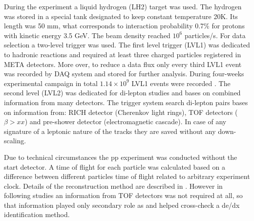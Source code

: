 During the experiment a liquid hydrogen (LH2) target was used. The hydrogen was stored in a special tank designated to keep constant temperature 20K. Its length was 50 mm, what corresponds to interaction probability 0.7\% for protons with kinetic energy 3.5 GeV. The beam density reached $10^6$ particles/s. For data selection a two-level trigger was used. The first level trigger (LVL1) was dedicated to hadronic reactions and required at least three charged particles registered in META detectors. More over, to reduce a data flux only every third LVL1 event was recorded by DAQ system and stored for further analysis. During four-weeks experimental campaign in total $1.14 \times 10^9$ LVL1 events were recorded \cite{hades_inclL_35}. The second level (LVL2) was dedicated for di-lepton studies and bases on combined information from many detectors. The trigger system search di-lepton pairs bases on information from: RICH detector (Cherenkov light rings), TOF detectors ($\beta>xx$) and pre-shower detector (electromagnetic cascade)\cite{Agakishiev:2009am,hades_DAQ}. In case of any signature of a leptonic nature of the tracks they are saved without any down-scaling.

Due to technical circumstances the pp experiment was conducted without the start detector. A time of flight for each particle was calculated based on a difference between different particles time of flight related to arbitrary experiment clock. Details of the reconstruction method are described in \cite{dybczak_phd}. However in following studies an information from TOF detectors was not required at all, so that information played only secondary role as and helped cross-check a de/dx identification method.
